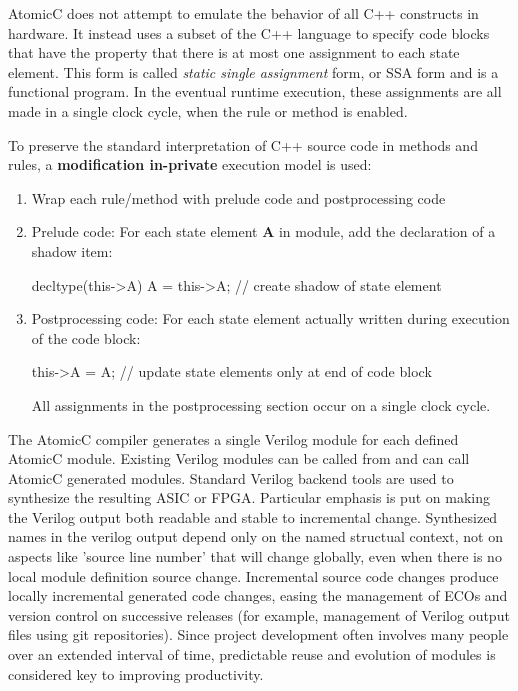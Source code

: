 AtomicC does not attempt to emulate the behavior of all C++ constructs in hardware.
It instead uses a subset of the C++ language to specify
code blocks that have the property that there is at most
one assignment to each state element.
This form is called \textit{static single assignment} form,
or SSA form\cite{Alpern:1988} and is a functional program\cite{Appel98ssais}.
In the eventual runtime execution, these assignments are
all made in a single clock cycle, when the rule or method
is enabled.

To preserve the standard interpretation of C++ source code
in methods and rules,
a \textbf{modification in-private} \cite[Sec.~3.2]{Prinz03operationalsemantics}
execution model is used:
\begin{enumerate}
\item Wrap each rule/method with prelude code and postprocessing code
\item Prelude code:
For each state element \textbf{A} in module, add the declaration of a shadow item:
\begin{codeblock}
decltype(this->A) A = this->A;    // create shadow of state element
\end{codeblock}
\item Postprocessing code:
For each state element actually written during execution of the code block:
\begin{codeblock}
this->A = A;                // update state elements only at end of code block
\end{codeblock}
All assignments in the postprocessing section occur on a single clock cycle.
\end{enumerate}

The AtomicC compiler 
generates a single Verilog module for each defined AtomicC module.
Existing Verilog modules can be called from and can call AtomicC
generated modules.
Standard Verilog backend tools are used to synthesize
the resulting ASIC or FPGA.
Particular emphasis is put on making the Verilog output both readable
and stable to incremental change.  Synthesized names in the verilog
output depend only on the named structual context, not on aspects
like 'source line number' that will change globally, even when there is no
local module definition source change.
Incremental source code changes produce locally incremental generated
code changes, easing the management of ECOs and version control
on successive releases (for example, management of Verilog output
files using git repositories).
Since project development often involves many people over an
extended interval of time, predictable reuse and evolution
of modules is considered key to improving productivity.

